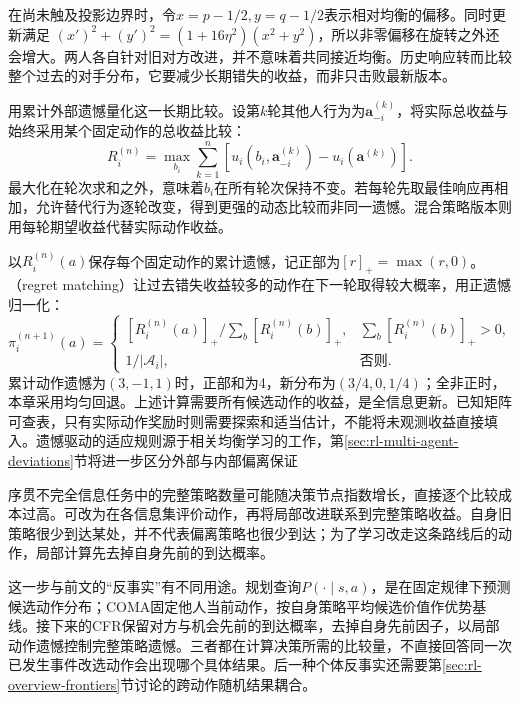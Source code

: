 在尚未触及投影边界时，令$x=p-1/2,y=q-1/2$表示相对均衡的偏移。同时更新满足
$(x')^2+(y')^2=(1+16\eta^2)(x^2+y^2)$，所以非零偏移在旋转之外还会增大。两人各自针对旧对方改进，并不意味着共同接近均衡。历史响应转而比较整个过去的对手分布，它要减少长期错失的收益，而非只击败最新版本。

用累计外部遗憾量化这一长期比较。设第$k$轮其他人行为为$\bm a_{-i}^{(k)}$，将实际总收益与始终采用某个固定动作的总收益比较：
\begin{equation}
 R_i^{(n)}
 =\max_{b_i}\sum_{k=1}^{n}
   [u_i(b_i,\bm a_{-i}^{(k)})
        -u_i(\bm a^{(k)})].
 \label{eq:rl-multi-agent-external-regret}
\end{equation}
最大化在轮次求和之外，意味着$b_i$在所有轮次保持不变。若每轮先取最佳响应再相加，允许替代行为逐轮改变，得到更强的动态比较而非同一遗憾。混合策略版本则用每轮期望收益代替实际动作收益。

以$R_i^{(n)}(a)$保存每个固定动作的累计遗憾，记正部为$[r]_+=\max(r,0)$。（regret matching）让过去错失收益较多的动作在下一轮取得较大概率，用正遗憾归一化：
\[
 \pi_i^{(n+1)}(a)=
 \begin{cases}
 [R_i^{(n)}(a)]_+/\sum_b[R_i^{(n)}(b)]_+,
       &\sum_b[R_i^{(n)}(b)]_+>0,\\
 1/|\mathcal A_i|,&\text{否则}.
 \end{cases}
\]
累计动作遗憾为$(3,-1,1)$时，正部和为4，新分布为$(3/4,0,1/4)$；全非正时，本章采用均匀回退。上述计算需要所有候选动作的收益，是全信息更新。已知矩阵可查表，只有实际动作奖励时则需要探索和适当估计，不能将未观测收益直接填入。遗憾驱动的适应规则源于相关均衡学习的工作，第\ref{sec:rl-multi-agent-deviations}节将进一步区分外部与内部偏离保证

序贯不完全信息任务中的完整策略数量可能随决策节点指数增长，直接逐个比较成本过高。可改为在各信息集评价动作，再将局部改进联系到完整策略收益。自身旧策略很少到达某处，并不代表偏离策略也很少到达；为了学习改走这条路线后的动作，局部计算先去掉自身先前的到达概率。

这一步与前文的“反事实”有不同用途。规划查询$P(\cdot\mid s,a)$，是在固定规律下预测候选动作分布；COMA固定他人当前动作，按自身策略平均候选价值作优势基线。接下来的CFR保留对方与机会先前的到达概率，去掉自身先前因子，以局部动作遗憾控制完整策略遗憾。三者都在计算决策所需的比较量，不直接回答同一次已发生事件改选动作会出现哪个具体结果。后一种个体反事实还需要第\ref{sec:rl-overview-frontiers}节讨论的跨动作随机结果耦合。

